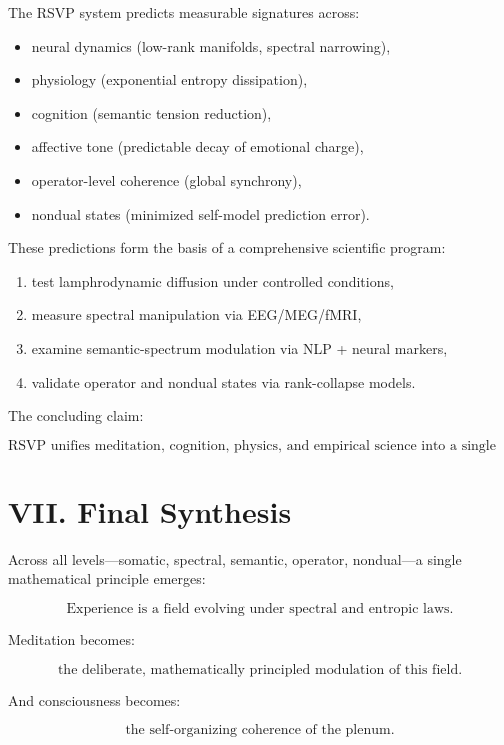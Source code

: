 \documentclass[12pt]{article}
\begin{document}
The RSVP system predicts measurable signatures across:

\begin{itemize}
    \item neural dynamics (low-rank manifolds, spectral narrowing),
    \item physiology (exponential entropy dissipation),
    \item cognition (semantic tension reduction),
    \item affective tone (predictable decay of emotional charge),
    \item operator-level coherence (global synchrony),
    \item nondual states (minimized self-model prediction error).
\end{itemize}

These predictions form the basis of a comprehensive scientific program:

\begin{enumerate}
    \item test lamphrodynamic diffusion under controlled conditions,
    \item measure spectral manipulation via EEG/MEG/fMRI,
    \item examine semantic-spectrum modulation via NLP + neural markers,
    \item validate operator and nondual states via rank-collapse models.
\end{enumerate}

The concluding claim:

\[
\boxed{
\text{RSVP unifies meditation, cognition, physics, and empirical science 
into a single experimentally testable architecture.}
}
\]

\section*{VII. Final Synthesis}

Across all levels—somatic, spectral, semantic, operator, nondual—a single
mathematical principle emerges:

\[
\boxed{
\text{Experience is a field evolving under spectral and entropic laws.}
}
\]

Meditation becomes:

\[
\text{the deliberate, mathematically principled modulation of this field}.
\]

And consciousness becomes:

\[
\text{the self-organizing coherence of the plenum}.
\]
\end{document}
